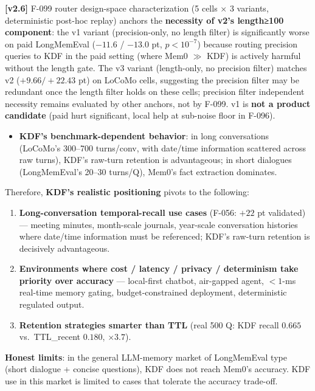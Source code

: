 \textbf{{[}v2.6{]}} F-099 router design-space characterization (5 cells × 3 variants, deterministic post-hoc replay) anchors the \textbf{necessity of v2's length≥100 component}: the v1 variant (precision-only, no length filter) is significantly worse on paid LongMemEval (\(-11.6\) / \(-13.0\) pt, \(p < 10^{-7}\)) because routing precision queries to KDF in the paid setting (where Mem0 \(\gg\) KDF) is actively harmful without the length gate. The v3 variant (length-only, no precision filter) matches v2 (\(+9.66 / +22.43\) pt) on LoCoMo cells, suggesting the precision filter may be redundant once the length filter holds on these cells; precision filter independent necessity remains evaluated by other anchors, not by F-099. v1 is \textbf{not a product candidate} (paid hurt significant, local help at sub-noise floor in F-096).

\begin{itemize}
\tightlist
\item
  \textbf{KDF's benchmark-dependent behavior}: in long conversations (LoCoMo's 300--700 turns/conv, with date/time information scattered across raw turns), KDF's raw-turn retention is advantageous; in short dialogues (LongMemEval's 20--30 turns/Q), Mem0's fact extraction dominates.
\end{itemize}

Therefore, \textbf{KDF's realistic positioning} pivots to the following:

\begin{enumerate}
\def\labelenumi{\arabic{enumi}.}
\tightlist
\item
  \textbf{Long-conversation temporal-recall use cases} (F-056: \(+22\) pt validated) --- meeting minutes, month-scale journals, year-scale conversation histories where date/time information must be referenced; KDF's raw-turn retention is decisively advantageous.
\item
  \textbf{Environments where cost / latency / privacy / determinism take priority over accuracy} --- local-first chatbot, air-gapped agent, \(< 1\)-ms real-time memory gating, budget-constrained deployment, deterministic regulated output.
\item
  \textbf{Retention strategies smarter than TTL} (real 500 Q: KDF recall \(0.665\) vs.~TTL\_recent \(0.180\), \(\times 3.7\)).
\end{enumerate}

\textbf{Honest limits}: in the general LLM-memory market of LongMemEval type (short dialogue + concise questions), KDF does not reach Mem0's accuracy. KDF use in this market is limited to cases that tolerate the accuracy trade-off.

